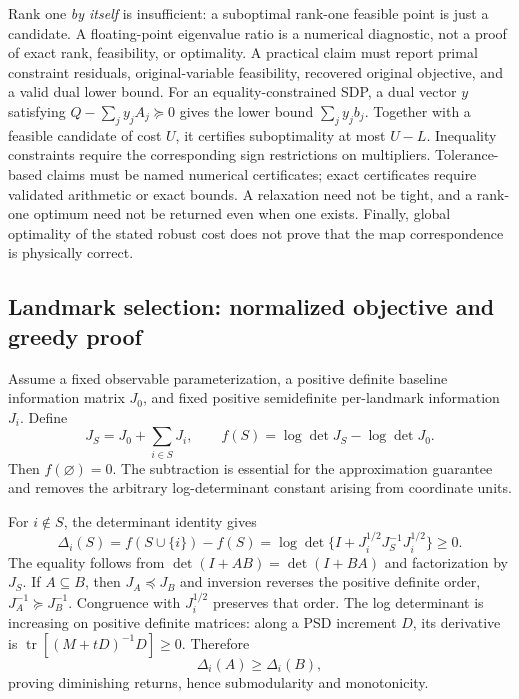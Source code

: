 Rank one \emph{by itself} is insufficient: a suboptimal rank-one feasible
point is just a candidate. A floating-point eigenvalue ratio is a
numerical diagnostic, not a proof of exact rank, feasibility, or
optimality. A practical claim must report primal constraint residuals,
original-variable feasibility, recovered original objective, and a
valid dual lower bound. For an equality-constrained SDP, a dual vector
$y$ satisfying $Q-\sum_j y_jA_j\succeq0$ gives the lower bound
$\sum_jy_jb_j$. Together with a feasible candidate of cost $U$, it
certifies suboptimality at most $U-L$. Inequality constraints require
the corresponding sign restrictions on multipliers. Tolerance-based
claims must be named numerical certificates; exact certificates require
validated arithmetic or exact bounds. A relaxation need not be tight,
and a rank-one optimum need not be returned even when one exists.
Finally, global optimality of the stated robust cost does not prove
that the map correspondence is physically correct.

\subsection{Landmark selection: normalized objective and greedy proof}

Assume a fixed observable parameterization, a positive definite baseline
information matrix $J_0$, and fixed positive semidefinite per-landmark
information $J_i$. Define
\begin{equation}
 J_S=J_0+\sum_{i\in S}J_i,\qquad
 f(S)=\log\det J_S-\log\det J_0.
 \label{eq:normalized-information}
\end{equation}
Then $f(\varnothing)=0$. The subtraction is essential for the
approximation guarantee and removes the arbitrary log-determinant
constant arising from coordinate units.

For $i\notin S$, the determinant identity gives
\begin{equation}
 \Delta_i(S)=f(S\cup\{i\})-f(S)
 =\log\det\{I+J_i^{1/2}J_S^{-1}J_i^{1/2}\}\geq0.
\end{equation}
The equality follows from $\det(I+AB)=\det(I+BA)$ and factorization by
$J_S$. If $A\subseteq B$, then $J_A\preceq J_B$ and inversion reverses
the positive definite order, $J_A^{-1}\succeq J_B^{-1}$.
Congruence with $J_i^{1/2}$ preserves that order. The log determinant
is increasing on positive definite matrices: along a PSD increment
$D$, its derivative is $\operatorname{tr}[(M+tD)^{-1}D]\geq0$.
Therefore
\begin{equation}
 \Delta_i(A)\geq\Delta_i(B),
\end{equation}
proving diminishing returns, hence submodularity and monotonicity.

